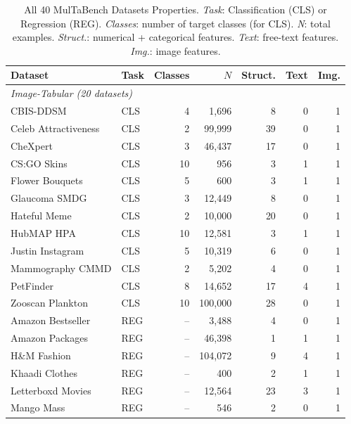 \begin{table}
\centering
\caption{All 40 MulTaBench Datasets Properties. \textit{Task}: Classification (CLS) or Regression (REG). \textit{Classes}: number of target classes (for CLS). \textit{N}: total examples. \textit{Struct.}: numerical + categorical features. \textit{Text}: free-text features. \textit{Img.}: image features.}
\label{tab:multabench_datasets}
\footnotesize
\begin{tabular}{llrrrrr}
\toprule
Dataset & Task & Classes & $N$ & Struct. & Text & Img. \\
\midrule
\multicolumn{7}{l}{\textit{Image-Tabular (20 datasets)}} \\
\midrule
CBIS-DDSM                 & CLS &   4 &  1,696  &  8  &  0 & 1 \\
Celeb Attractiveness      & CLS &  2 & 99,999  & 39  &  0 & 1 \\
CheXpert                  & CLS &   3 & 46,437  & 17  &  0 & 1 \\
CS:GO Skins               & CLS &  10 &    956  &  3  &  1 & 1 \\
Flower Bouquets           & CLS &   5 &    600  &  3  &  1 & 1 \\
Glaucoma SMDG             & CLS &   3 & 12,449  &  8  &  0 & 1 \\
Hateful Meme              & CLS &  2 & 10,000  & 20  &  0 & 1 \\
HubMAP HPA                & CLS &  10 & 12,581  &  3  &  1 & 1 \\
Justin Instagram          & CLS &   5 & 10,319  &  6  &  0 & 1 \\
Mammography CMMD          & CLS &  2 &  5,202  &  4  &  0 & 1 \\
PetFinder                 & CLS &   8 & 14,652  & 17  &  4 & 1 \\
Zooscan Plankton          & CLS &  10 & 100,000 & 28  &  0 & 1 \\
Amazon Bestseller         & REG &  -- &  3,488  &  4  &  0 & 1 \\
Amazon Packages           & REG &  -- & 46,398  &  1  &  1 & 1 \\
H\&M Fashion              & REG &  -- & 104,072 &  9  &  4 & 1 \\
Khaadi Clothes            & REG &  -- &    400  &  2  &  1 & 1 \\
Letterboxd Movies         & REG &  -- & 12,564  & 23  &  3 & 1 \\
Mango Mass                & REG &  -- &    546  &  2  &  0 & 1 \\

\end{tabular}
\end{table}
